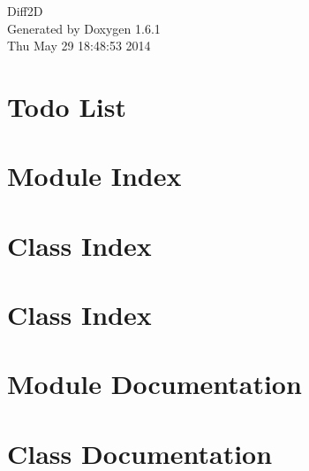 \documentclass[a4paper]{book}
\begin{document}
\hypersetup{pageanchor=false}
\begin{titlepage}
\vspace*{7cm}
\begin{center}
{\Large Diff2D }\\
\vspace*{1cm}
{\large Generated by Doxygen 1.6.1}\\
\vspace*{0.5cm}
{\small Thu May 29 18:48:53 2014}\\
\end{center}
\end{titlepage}
\clearemptydoublepage
{}
\tableofcontents
\clearemptydoublepage
{}
\hypersetup{pageanchor=true}
\chapter{Todo List}
\label{todo}
\hypertarget{todo}{}

\chapter{Module Index}

\chapter{Class Index}

\chapter{Class Index}

\chapter{Module Documentation}

\chapter{Class Documentation}


















\printindex
\end{document}
